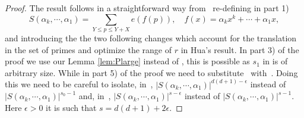 \documentclass[12pt]{amsart}
\def\le{\leqslant}
\begin{document}
\begin{proof}
The result follows in a straightforward way from~\cite[Theorem~16]{Hua} re-defining in part 1) 
$$S(\alpha_k,\cdots,\alpha_1)=\sum_{Y\le p \le Y+X}e(f(p)), \quad f(x)=\alpha_kx^k+\cdots+\alpha_1 x,$$
and introducing the the two following changes which account for the translation in the set of primes and optimize the range of $r$ in Hua's result.
In part 3) of the proof we use our Lemma \ref{lem:Plarge} instead of \cite[Theorem~10]{Hua}, this is possible as $s_1$ in \cite[Lemma 10.8]{Hua} is of arbitrary size. While in part 5) of the proof we need to substitute~\cite[Theorem~15]{Hua} with~\cite[Theorem~1]{BDG}. Doing this we need to be careful to isolate, in~\cite[pag. 144]{Hua}, $\left|S(\alpha_k,\cdots,\alpha_1) \right|^{d(d+1)-\epsilon} $ instead of $\left|S(\alpha_k,\cdots,\alpha_1) \right|^{s_0-1}$ and, in~\cite[pag. 145]{Hua}, $\left|S(\alpha_k,\cdots,\alpha_1) \right|^{s-\epsilon} $ instead of $\left|S(\alpha_k,\cdots,\alpha_1) \right|^{s-1}$. Here $\epsilon >0$ it is such that $s=d(d+1)+2\epsilon$. 
\end{proof}
\end{document}
